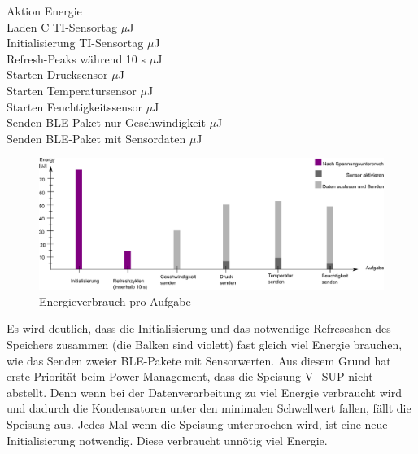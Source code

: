 
\begin{minipage}{\textwidth}
\label{tab_zsm}
\begin{tabbing}
    Aktion \hspace{6cm}                       \quad\= Energie \\[0.8ex]
    Laden C TI-Sensortag             $\mu$J \\
    Initialisierung TI-Sensortag     $\mu$J \\
    Refresh-Peaks während 10 s       $\mu$J \\
    Starten Drucksensor              $\mu$J \\
    Starten Temperatursensor          $\mu$J \\
    Starten Feuchtigkeitssensor      $\mu$J \\
    Senden BLE-Paket nur Geschwindigkeit $\mu$J\\
    Senden BLE-Paket mit Sensordaten    $\mu$J \\
\end{tabbing}
\end{minipage}


\begin{figure}[ht]
  \includegraphics[width=1.0\textwidth]{3Vorgehen/imag/Energy_pro_Aufgabe.png}
  \caption{Energieverbrauch pro Aufgabe}
  \label{energie_zsm}
\end{figure}

Es wird deutlich, dass die Initialisierung und das notwendige Refreseshen des Speichers zusammen (die Balken sind violett)  fast gleich viel Energie brauchen, wie das Senden zweier BLE-Pakete mit Sensorwerten. Aus diesem Grund hat erste Priorität beim Power Management, dass die Speisung V\_SUP nicht abstellt. Denn wenn bei der Datenverarbeitung zu viel Energie verbraucht wird und dadurch die Kondensatoren unter den minimalen Schwellwert fallen, fällt die Speisung aus. Jedes Mal wenn die Speisung unterbrochen wird, ist eine neue Initialisierung notwendig. Diese verbraucht unnötig viel Energie.


